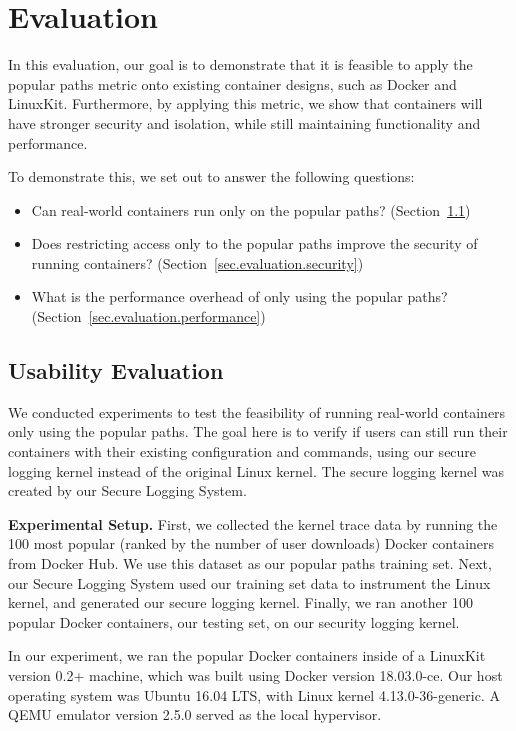 \section{Evaluation}
\label{sec.evaluation}
In this evaluation, our goal is to demonstrate that it is feasible to apply the popular paths metric onto existing container designs, such as Docker and LinuxKit. 
Furthermore, by applying this metric, we show that containers will have stronger security and isolation, while still maintaining functionality and performance.  

To demonstrate this, we set out to answer the following questions: 

\begin{itemize}
\item Can real-world containers run only on the popular paths? (Section~{\ref{sec.evaluation.usability}})
\item Does restricting access only to the popular paths improve the security of running containers? (Section~{\ref{sec.evaluation.security}})
\item What is the performance overhead of only using the popular paths? (Section~{\ref{sec.evaluation.performance}})
\end{itemize}

\subsection{Usability Evaluation}
\label{sec.evaluation.usability} 
We conducted experiments to test the feasibility of running real-world containers only using the popular paths. 
The goal here is to verify if users can still run their containers with their existing configuration and commands, 
using our secure logging kernel instead of the original Linux kernel. The secure logging kernel was created by our Secure Logging System.

\textbf{Experimental Setup.}
First, we collected the kernel trace data by running the 100 most popular (ranked by the number of user downloads) Docker containers from Docker Hub. 
We use this dataset as our popular paths training set. Next, our Secure Logging System used our training set data to instrument the Linux kernel, 
and generated our secure logging kernel. Finally, we ran another 100 popular Docker containers,  our testing set, on our security logging kernel. 

In our experiment, we ran the popular Docker containers inside of a LinuxKit version 0.2+ machine, which was built using Docker version 18.03.0-ce. 
Our host operating system was Ubuntu 16.04 LTS, with Linux kernel 4.13.0-36-generic. A QEMU emulator version 2.5.0 served as the local hypervisor. 

